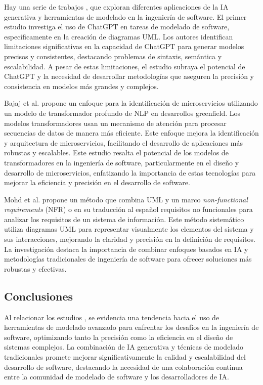 Hay una serie de trabajos \cite{Cámara2023}\cite{Bajaj2024}\cite{Arif2023}, que exploran diferentes aplicaciones de la IA generativa y herramientas de modelado en la ingeniería de software. El primer estudio \cite{Cámara2023} investiga el uso de ChatGPT en tareas de modelado de software, específicamente en la creación de diagramas UML. Los autores identifican limitaciones significativas en la capacidad de ChatGPT para generar modelos precisos y consistentes, destacando problemas de sintaxis, semántica y escalabilidad. A pesar de estas limitaciones, el estudio subraya el potencial de ChatGPT y la necesidad de desarrollar metodologías que aseguren la precisión y consistencia en modelos más grandes y complejos. 

Bajaj et al. \cite{Bajaj2024} propone un enfoque para la identificación de microservicios utilizando un modelo de transformador profundo de NLP en desarrollos greenfield. Los modelos transformadores usan un mecanismo de atención para procesar secuencias de datos de manera más eficiente. Este enfoque mejora la identificación y arquitectura de microservicios, facilitando el desarrollo de aplicaciones más robustas y escalables. Este estudio resalta el potencial de los modelos de transformadores en la ingeniería de software, particularmente en el diseño y desarrollo de microservicios, enfatizando la importancia de estas tecnologías para mejorar la eficiencia y precisión en el desarrollo de software.

Mohd et al. \cite{Arif2023} propone un método que combina UML y un marco \textit{non-functional requirements} (NFR) o en su traducción al español requisitos no funcionales para analizar los requisitos de un sistema de información. Este método sistemático utiliza diagramas UML para representar visualmente los elementos del sistema y sus interacciones, mejorando la claridad y precisión en la definición de requisitos. La investigación destaca la importancia de combinar enfoques basados en IA y metodologías tradicionales de ingeniería de software para ofrecer soluciones más robustas y efectivas. 

\subsection{Conclusiones}

Al relacionar los estudios \cite{Cámara2023}\cite{Bajaj2024}\cite{Arif2023} , se evidencia una tendencia hacia el uso de herramientas de modelado avanzado para enfrentar los desafíos en la ingeniería de software, optimizando tanto la precisión como la eficiencia en el diseño de sistemas complejos. La combinación de IA generativa y técnicas de modelado tradicionales promete mejorar significativamente la calidad y escalabilidad del desarrollo de software, destacando la necesidad de una colaboración continua entre la comunidad de modelado de software y los desarrolladores de IA.

